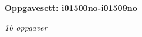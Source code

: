 \centerline{\bf Oppgavesett: i01500no-i01509no}
\vskip 10pt
\centerline{\it 10 oppgaver}\vskip 10pt
\vskip 10pt
